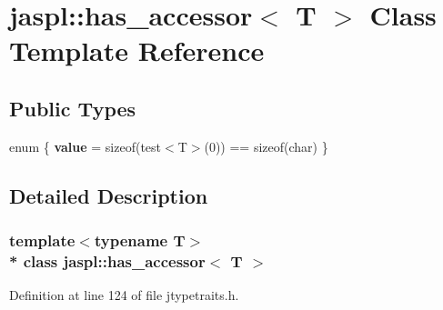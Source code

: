 \hypertarget{classjaspl_1_1has__accessor}{}\section{jaspl\+:\+:has\+\_\+accessor$<$ T $>$ Class Template Reference}
\label{classjaspl_1_1has__accessor}
\subsection*{Public Types}
\begin{DoxyCompactItemize}
\item 
enum \{ {\bfseries value} = sizeof(test$<$T$>$(0)) == sizeof(char)
 \}\hypertarget{classjaspl_1_1has__accessor_a28163371a4d385252bfaacbed6770491}{}\label{classjaspl_1_1has__accessor_a28163371a4d385252bfaacbed6770491}

\end{DoxyCompactItemize}


\subsection{Detailed Description}
\subsubsection*{template$<$typename T$>$\\*
class jaspl\+::has\+\_\+accessor$<$ T $>$}



Definition at line 124 of file jtypetraits.\+h.

